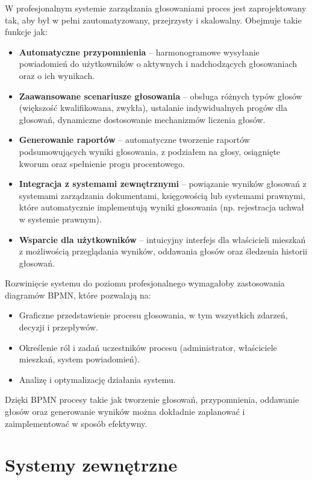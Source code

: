 W profesjonalnym systemie zarządzania głosowaniami proces jest zaprojektowany tak, aby był w pełni zautomatyzowany, przejrzysty i skalowalny. Obejmuje takie funkcje jak:
\begin{itemize}
    \item \textbf{Automatyczne przypomnienia} -- harmonogramowe wysyłanie powiadomień do użytkowników o aktywnych i nadchodzących głosowaniach oraz o ich wynikach. 
    \item \textbf{Zaawansowane scenariusze głosowania} -- obsługa różnych typów głosów (większość kwalifikowana, zwykła), ustalanie indywidualnych progów dla głosowań, dynamiczne dostosowanie mechanizmów liczenia głosów.
    \item \textbf{Generowanie raportów} -- automatyczne tworzenie raportów podsumowujących wyniki głosowania, z podziałem na głosy, osiągnięte kworum oraz spełnienie progu procentowego.
    \item \textbf{Integracja z systemami zewnętrznymi} -- powiązanie wyników głosowań z systemami zarządzania dokumentami, księgowością lub systemami prawnymi, które automatycznie implementują wyniki głosowania (np. rejestracja uchwał w systemie prawnym).
    \item \textbf{Wsparcie dla użytkowników} -- intuicyjny interfejs dla właścicieli mieszkań z możliwością przeglądania wyników, oddawania głosów oraz śledzenia historii głosowań.
\end{itemize}

Rozwinięcie systemu do poziomu profesjonalnego wymagałoby zastosowania diagramów BPMN, które pozwalają na:
\begin{itemize}
    \item Graficzne przedstawienie procesu głosowania, w tym wszystkich zdarzeń, decyzji i przepływów.
    \item Określenie ról i zadań uczestników procesu (administrator, właściciele mieszkań, system powiadomień).
    \item Analizę i optymalizację działania systemu.
\end{itemize}

Dzięki BPMN procesy takie jak tworzenie głosowań, przypomnienia, oddawanie głosów oraz generowanie wyników można dokładnie zaplanować i zaimplementować w sposób efektywny.


\section{Systemy zewnętrzne}

